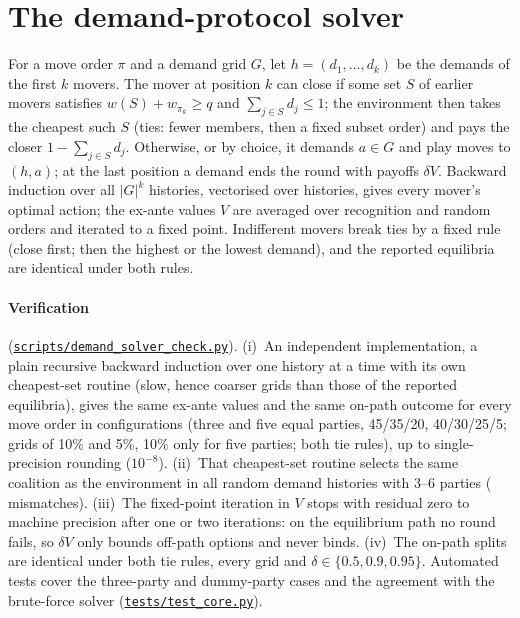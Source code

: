 \documentclass[11pt,a4paper]{article}
\newcommand{\repo}{https://github.com/bot2048/cabinet-bargaining-marl}
\newcommand{\code}[1]{\href{\repo/blob/main/#1}{\texttt{\small #1}}}
\begin{document}
\section{The demand-protocol solver}\label{app:solver}
For a move order $\pi$ and a demand grid $G$, let $h=(d_1,\dots,d_k)$ be the demands of the first $k$
movers. The mover at position $k$ can close if some set $S$ of earlier movers satisfies
$w(S)+w_{\pi_k}\ge q$ and $\sum_{j\in S}d_j\le1$; the environment then takes the cheapest such $S$ (ties:
fewer members, then a fixed subset order) and pays the closer $1-\sum_{j\in S}d_j$. Otherwise, or by
choice, it demands $a\in G$ and play moves to $(h,a)$; at the last position a demand ends the round with
payoffs $\delta V$. Backward induction over all $|G|^k$ histories, vectorised over histories, gives every
mover's optimal action; the ex-ante values $V$ are averaged over recognition and random orders and
iterated to a fixed point. Indifferent movers break ties by a fixed rule (close first; then the highest
or the lowest demand), and the reported equilibria are identical under both rules. \paragraph{Verification} (\code{scripts/demand\_solver\_check.py}). (i)~An independent implementation, a plain recursive backward induction over one history at a time
with its own cheapest-set routine (slow, hence coarser grids than those of the reported equilibria), gives
the same ex-ante values and the same on-path outcome for every move order in \SolverCompared{}
configurations (three and five equal parties, 45/35/20, 40/30/25/5; grids of 10\% and 5\%, 10\% only for five parties; both tie
rules), up to single-precision rounding ($10^{-8}$). (ii)~That cheapest-set routine selects the same
coalition as the environment in all \SolverEnvN{} random demand histories with 3--6 parties
(\SolverEnvBad{} mismatches). (iii)~The fixed-point iteration in $V$ stops with residual zero to machine
precision after one or two iterations: on the equilibrium path no round fails, so $\delta V$ only bounds
off-path options and never binds. (iv)~The on-path splits are identical under both tie rules, every grid
and $\delta\in\{0.5,0.9,0.95\}$. Automated tests cover the three-party and dummy-party cases and the
agreement with the brute-force solver (\code{tests/test\_core.py}).
\end{document}
